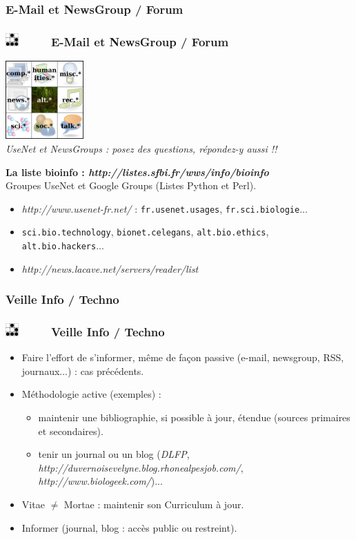 \documentclass[slidetop,11pt]{beamer}
\def\sectionPartIIIaDE{E-Mail et NewsGroup / Forum}
\def\sectionPartIIIaTR{Veille Info / Techno}
\def\moreInFrameTitle{\includegraphics[height=0.5cm]{img/logo_glider.png}~~~~~}
\begin{document}
\subsubsection{\sectionPartIIIaDE}
\begin{frame}
	\frametitle{\moreInFrameTitle \sectionPartIIIaDE}
	\begin{center}
	\includegraphics[width=3cm]{img/usenet-hierarchie.png}~\\ 
	\emph{UseNet et NewsGroups : posez des questions, r{\'e}pondez-y aussi !! }
	\end{center}
	\textbf{La liste bioinfo : \emph{http://listes.sfbi.fr/wws/info/bioinfo} }~\\
	Groupes UseNet et Google Groups (Listes Python et Perl). ~\\
	\begin{itemize}
		\item \emph{http://www.usenet-fr.net/} : \texttt{fr.usenet.usages}, \texttt{fr.sci.biologie}...
		\item \texttt{sci.bio.technology}, \texttt{bionet.celegans}, \texttt{alt.bio.ethics}, \texttt{alt.bio.hackers}...
		\item \emph{http://news.lacave.net/servers/reader/list}
	\end{itemize}
\end{frame} 

\subsubsection{\sectionPartIIIaTR}
\begin{frame}
	\frametitle{\moreInFrameTitle \sectionPartIIIaTR}
	\begin{itemize}
		\item<1-> Faire l'effort de s'informer, m{\^e}me de fa\c{c}on passive (e-mail, newsgroup, RSS, journaux...) : cas pr{\'e}c{\'e}dents. 
		\item<2-> M{\'e}thodologie active (exemples) : 
		\begin{itemize}
			\item maintenir une bibliographie, si possible {\`a} jour, {\'e}tendue (sources primaires et secondaires). 
			\item tenir un journal ou un blog (\emph{DLFP}, \emph{http://duvernoisevelyne.blog.rhonealpesjob.com/}, \emph{http://www.biologeek.com/})...
		\end{itemize}
		\item<3-> Vitae $ \neq $ Mortae : maintenir son Curriculum {\`a} jour. 
		\item<3-> Informer (journal, blog : acc{\`e}s public ou restreint). 
	\end{itemize}
\end{frame}
\end{document}

